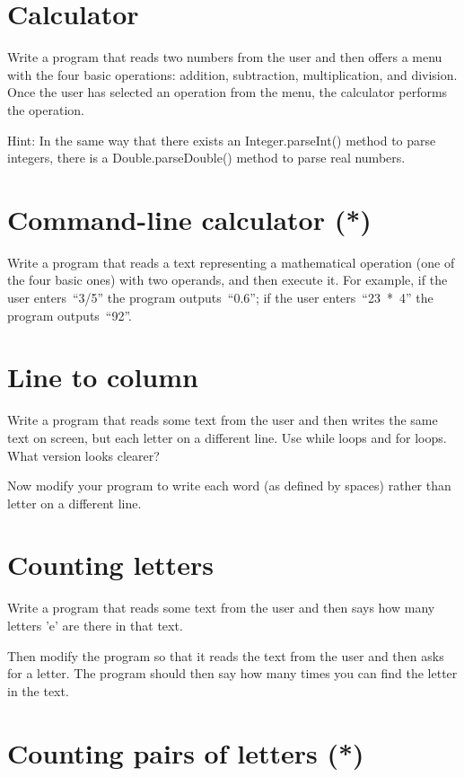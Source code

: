 \documentclass{article}
\begin{document}
\section{Calculator}
\label{sec:calculator}

Write a program that reads two numbers from the user and then offers a
menu with the four basic operations: addition, subtraction,
multiplication, and division. Once the user has selected an operation
from the menu, the calculator performs the operation.

Hint: In the same way that there exists an Integer.parseInt() method
to parse integers, there is a Double.parseDouble() method to parse
real numbers. 

\section{Command-line calculator (*)}
\label{sec:comm-line-calc}

Write a program that reads a text representing a mathematical
operation (one of the four basic ones) with two operands, and then
execute it. For example, if the user enters~``3/5'' the program
outputs~``0.6''; if the user enters~``23~*~4'' the program
outputs~``92''.

\section{Line to column}
\label{sec:line-column}

Write a program that reads some text from the user and then writes the
same text on screen, but each letter on a different line. 
Use while loops and for loops. What version looks clearer?

Now modify your program to write each word (as defined by spaces)
rather than letter on a different line. 

\section{Counting letters}
\label{sec:counting-letters}

Write a program that reads some text from the user and then says how
many letters 'e' are there in that text. 

Then modify the program so that it reads the text from the user and
then asks for a letter. The program should then say how many times you
can find the letter in the text. 

\section{Counting pairs of letters (*)}
\label{sec:count-pairs-lett}
\end{document}
